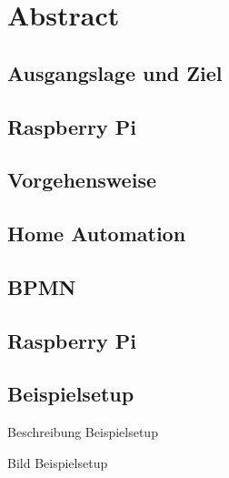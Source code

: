 
\section*{Abstract}

\subsection*{Ausgangslage und Ziel}

\subsection*{Raspberry Pi}

\subsection*{Vorgehensweise}


\subsection*{Home Automation}

\subsection*{BPMN}

\subsection*{Raspberry Pi}

\subsection*{Beispielsetup}
Beschreibung Beispielsetup

Bild Beispielsetup
